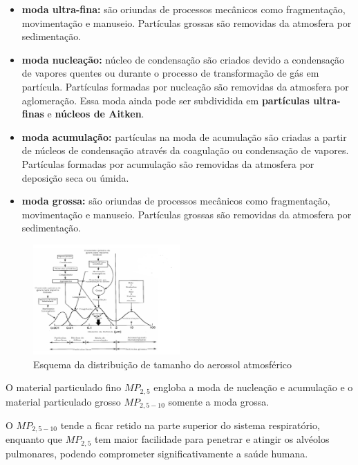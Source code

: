 \begin{itemize}
  \item \textbf{moda ultra-fina:} são oriundas de processos mecânicos como fragmentação, 
        movimentação e manuseio. Partículas grossas são removidas da atmosfera 
        por sedimentação.
  \item \textbf{moda nucleação:} núcleo de condensação são criados devido a 
        condensação de vapores quentes ou durante o processo de 
        transformação de gás em partícula. Partículas formadas por 
        nucleação são removidas da atmosfera por aglomeração. 
        Essa moda ainda pode ser subdividida em \textbf{partículas ultra-finas} e 
        \textbf{núcleos de Aitken}.  
  \item \textbf{moda acumulação:} partículas na moda de acumulação são criadas 
         a partir de núcleos de condensação através da coagulação ou 
         condensação de vapores. Partículas formadas por acumulação
         são removidas da atmosfera por deposição seca ou úmida.
  \item \textbf{moda grossa:} são oriundas de processos mecânicos como fragmentação, 
        movimentação e manuseio. Partículas grossas são removidas da atmosfera 
        por sedimentação.
\end{itemize}

\begin{figure}[H]
\begin{center}
  \includegraphics[width=0.5\textwidth]{../inputs/images/modas_aerossol.png}
  \caption{Esquema da distribuição de tamanho do aerossol atmosférico 
           \citep{finlayson1999} \label{fig:modas_aerossol}}
\end{center}
\end{figure}

O material particulado fino $MP_{2,5}$ engloba a moda de nucleação e acumulação e
o material particulado grosso $MP_{2,5-10}$ somente a moda grossa. 

O $MP_{2,5-10}$ tende a ficar retido na parte superior do sistema respiratório, 
enquanto que $MP_{2,5}$ tem maior facilidade para penetrar e atingir os alvéolos pulmonares, 
podendo comprometer significativamente a saúde humana. 

